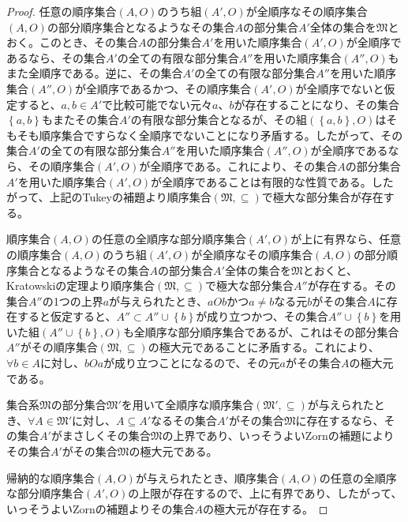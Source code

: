 \documentclass[dvipdfmx]{jsarticle}
\begin{document}
\begin{proof}
任意の順序集合$(A,O)$のうち組$\left( A',O \right)$が全順序なその順序集合$(A,O)$の部分順序集合となるようなその集合$A$の部分集合$A'$全体の集合を$\mathfrak{M}$とおく。このとき、その集合$A$の部分集合$A'$を用いた順序集合$\left( A',O \right)$が全順序であるなら、その集合$A'$の全ての有限な部分集合$A''$を用いた順序集合$\left( A'',O \right)$もまた全順序である。逆に、その集合$A'$の全ての有限な部分集合$A''$を用いた順序集合$\left( A'',O \right)$が全順序であるかつ、その順序集合$\left( A',O \right)$が全順序でないと仮定すると、$a,b \in A'$で比較可能でない元々$a$、$b$が存在することになり、その集合$\left\{ a,b \right\}$もまたその集合$A'$の有限な部分集合となるが、その組$\left( \left\{ a,b \right\},O \right)$はそもそも順序集合ですらなく全順序でないことになり矛盾する。したがって、その集合$A'$の全ての有限な部分集合$A''$を用いた順序集合$\left( A'',O \right)$が全順序であるなら、その順序集合$\left( A',O \right)$が全順序である。これにより、その集合$A$の部分集合$A'$を用いた順序集合$\left( A',O \right)$が全順序であることは有限的な性質である。したがって、上記のTukeyの補題より順序集合$\left( \mathfrak{M, \subseteq} \right)$で極大な部分集合が存在する。\par
順序集合$(A,O)$の任意の全順序な部分順序集合$\left( A',O \right)$が上に有界なら、任意の順序集合$(A,O)$のうち組$\left( A',O \right)$が全順序なその順序集合$(A,O)$の部分順序集合となるようなその集合$A$の部分集合$A'$全体の集合を$\mathfrak{M}$とおくと、Kratowskiの定理より順序集合$\left( \mathfrak{M, \subseteq} \right)$で極大な部分集合$A''$が存在する。その集合$A''$の1つの上界$a$が与えられたとき、$aOb$かつ$a \neq b$なる元$b$がその集合$A$に存在すると仮定すると、$A'' \subset A'' \cup \left\{ b \right\}$が成り立つかつ、その集合$A'' \cup \left\{ b \right\}$を用いた組$\left( A'' \cup \left\{ b \right\},O \right)$も全順序な部分順序集合であるが、これはその部分集合$A''$がその順序集合$\left( \mathfrak{M, \subseteq} \right)$の極大元であることに矛盾する。これにより、$\forall b \in A$に対し、$bOa$が成り立つことになるので、その元$a$がその集合$A$の極大元である。\par
集合系$\mathfrak{M}$の部分集合$\mathfrak{M}'$を用いて全順序な順序集合$\left( \mathfrak{M}', \subseteq \right)$が与えられたとき、$\forall A \in \mathfrak{M}'$に対し、$A \subseteq A'$なるその集合$A'$がその集合$\mathfrak{M}$に存在するなら、その集合$A'$がまさしくその集合$\mathfrak{M}$の上界であり、いっそうよいZornの補題によりその集合$A'$がその集合$\mathfrak{M}$の極大元である。\par
帰納的な順序集合$(A,O)$が与えられたとき、順序集合$(A,O)$の任意の全順序な部分順序集合$\left( A',O \right)$の上限が存在するので、上に有界であり、したがって、いっそうよいZornの補題よりその集合$A$の極大元が存在する。\par

\end{proof}
\end{document}
